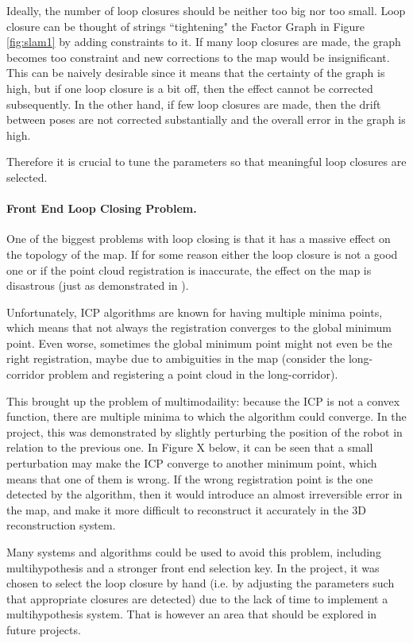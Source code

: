 \documentclass[11pt]{article}
\begin{document}
Ideally, the number of loop closures should be neither too big nor too small. Loop closure can be thought of strings ``tightening" the Factor Graph in Figure \ref{fig:slam1} by adding constraints to it. If many loop closures are made, the graph becomes too constraint and new corrections to the map would be insignificant. This can be naively desirable since it means that the certainty of the graph is high, but if one loop closure is a bit off, then the effect cannot be corrected subsequently. In the other hand, if few loop closures are made, then the drift between poses are not corrected substantially and the overall error in the graph is high.
	
Therefore it is crucial to tune the parameters so that meaningful loop closures are selected. 

\paragraph{Front End Loop Closing Problem.} One of the biggest problems with loop closing is that it has a massive effect on the topology of the map. If for some reason either the loop closure is not a good one or if the point cloud registration is inaccurate, the effect on the map is disastrous (just as demonstrated in \cite{latif2013robust}).
	
Unfortunately, ICP algorithms are known for having multiple minima points, which means that not always the registration converges to the global minimum point. Even worse, sometimes the global minimum point might not even be the right registration, maybe due to ambiguities in the map (consider the long-corridor problem and registering a point cloud in the long-corridor).
	
This brought up the problem of multimodaility: because the ICP is not a convex function, there are multiple minima to which the algorithm could converge. In the project, this was demonstrated by slightly perturbing the position of the robot in relation to the previous one. In Figure X below, it can be seen that a small perturbation may make the ICP converge to another minimum point, which means that one of them is wrong. If the wrong registration point is the one detected by the algorithm, then it would introduce an almost irreversible error in the map, and make it more difficult to reconstruct it accurately in the 3D reconstruction system.
	
Many systems and algorithms could be used to avoid this problem, including multihypothesis and a stronger front end selection key. In the project, it was chosen to select the loop closure by hand (i.e. by adjusting the parameters such that appropriate closures are detected) due to the lack of time to implement a multihypothesis system. That is however an area that should be explored in future projects.
\end{document}

